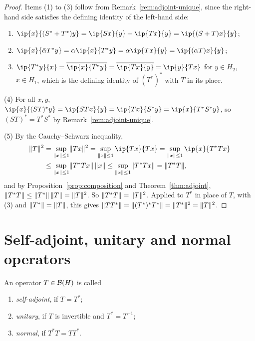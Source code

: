 \begin{proof}
Items (1) to (3) follow from Remark~\ref{rem:adjoint-unique}, since the
right-hand side satisfies the defining identity of the left-hand side:
\begin{enumerate}
  \item $\ip{x}{(S^* + T^*)y} = \ip{Sx}{y} + \ip{Tx}{y} = \ip{(S + T)x}{y}$;
  \item $\ip{x}{\bar{\alpha} T^* y} = \alpha\ip{x}{T^* y}
    = \alpha\ip{Tx}{y} = \ip{(\alpha T)x}{y}$;
  \item $\ip{T^* y}{x} = \overline{\ip{x}{T^* y}} = \overline{\ip{Tx}{y}}
    = \ip{y}{Tx}$ for $y \in H_2$, $x \in H_1$, which is the defining
    identity of $(T^*)^*$ with $T$ in its place.
\end{enumerate}
(4) For all $x, y$,
$\ip{x}{(ST)^* y} = \ip{STx}{y} = \ip{Tx}{S^* y} = \ip{x}{T^* S^* y}$, so
$(ST)^* = T^* S^*$ by Remark~\ref{rem:adjoint-unique}.

(5) By the Cauchy--Schwarz inequality,
\[
  \begin{aligned}
    \norm{T}^2 &= \sup_{\norm{x} \le 1} \norm{Tx}^2
    = \sup_{\norm{x} \le 1} \ip{Tx}{Tx}
    = \sup_{\norm{x} \le 1} \ip{x}{T^* T x} \\
    &\le \sup_{\norm{x} \le 1} \norm{T^* T x}\,\norm{x}
    \le \sup_{\norm{x} \le 1} \norm{T^* T x} = \norm{T^* T} ,
  \end{aligned}
\]
and by Proposition~\ref{prop:composition} and Theorem~\ref{thm:adjoint},
$\lVert T^* T\rVert \le \lVert T^*\rVert\,\lVert T\rVert = \lVert T\rVert^2$. So
$\lVert T^* T\rVert = \lVert T\rVert^2$. Applied to $T^*$ in place of $T$, with (3) and
$\lVert T^*\rVert = \lVert T\rVert$, this gives
$\lVert T T^*\rVert = \lVert(T^*)^* T^*\rVert = \lVert T^*\rVert^2 = \lVert T\rVert^2$.
\end{proof}

\section{Self-adjoint, unitary and normal operators}

\begin{definition}\label{def:operator-classes}
An operator $T \in \mathcal{B}(H)$ is called
\begin{enumerate}
  \item \emph{self-adjoint}, if $T = T^*$;
  \item \emph{unitary}, if $T$ is invertible and $T^* = T^{-1}$;
  \item \emph{normal}, if $T^* T = T T^*$.
\end{enumerate}
\end{definition}

